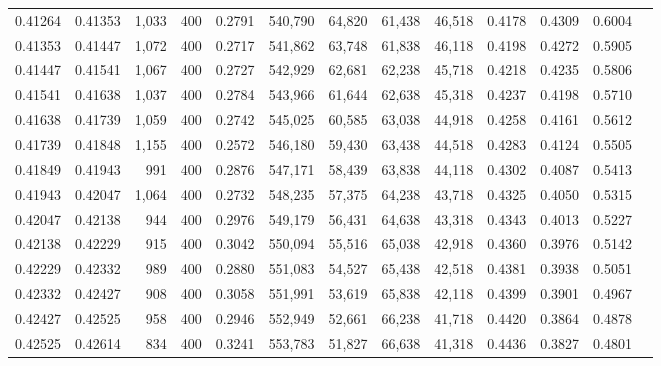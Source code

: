\begin{tabular}{rrrrrrrrrrrrr}
0.41264 & 0.41353 &  1,033 &   400 &                                     0.2791 & 540,790 &  64,820 &  61,438 &  46,518 & 0.4178 & 0.4309 & 0.6004 \\
0.41353 & 0.41447 &  1,072 &   400 &                                     0.2717 & 541,862 &  63,748 &  61,838 &  46,118 & 0.4198 & 0.4272 & 0.5905 \\
0.41447 & 0.41541 &  1,067 &   400 &                                     0.2727 & 542,929 &  62,681 &  62,238 &  45,718 & 0.4218 & 0.4235 & 0.5806 \\
0.41541 & 0.41638 &  1,037 &   400 &                                     0.2784 & 543,966 &  61,644 &  62,638 &  45,318 & 0.4237 & 0.4198 & 0.5710 \\
0.41638 & 0.41739 &  1,059 &   400 &                                     0.2742 & 545,025 &  60,585 &  63,038 &  44,918 & 0.4258 & 0.4161 & 0.5612 \\
0.41739 & 0.41848 &  1,155 &   400 &                                     0.2572 & 546,180 &  59,430 &  63,438 &  44,518 & 0.4283 & 0.4124 & 0.5505 \\
0.41849 & 0.41943 &    991 &   400 &                                     0.2876 & 547,171 &  58,439 &  63,838 &  44,118 & 0.4302 & 0.4087 & 0.5413 \\
0.41943 & 0.42047 &  1,064 &   400 &                                     0.2732 & 548,235 &  57,375 &  64,238 &  43,718 & 0.4325 & 0.4050 & 0.5315 \\
0.42047 & 0.42138 &    944 &   400 &                                     0.2976 & 549,179 &  56,431 &  64,638 &  43,318 & 0.4343 & 0.4013 & 0.5227 \\
0.42138 & 0.42229 &    915 &   400 &                                     0.3042 & 550,094 &  55,516 &  65,038 &  42,918 & 0.4360 & 0.3976 & 0.5142 \\
0.42229 & 0.42332 &    989 &   400 &                                     0.2880 & 551,083 &  54,527 &  65,438 &  42,518 & 0.4381 & 0.3938 & 0.5051 \\
0.42332 & 0.42427 &    908 &   400 &                                     0.3058 & 551,991 &  53,619 &  65,838 &  42,118 & 0.4399 & 0.3901 & 0.4967 \\
0.42427 & 0.42525 &    958 &   400 &                                     0.2946 & 552,949 &  52,661 &  66,238 &  41,718 & 0.4420 & 0.3864 & 0.4878 \\
0.42525 & 0.42614 &    834 &   400 &                                     0.3241 & 553,783 &  51,827 &  66,638 &  41,318 & 0.4436 & 0.3827 & 0.4801 \\

\end{tabular}
